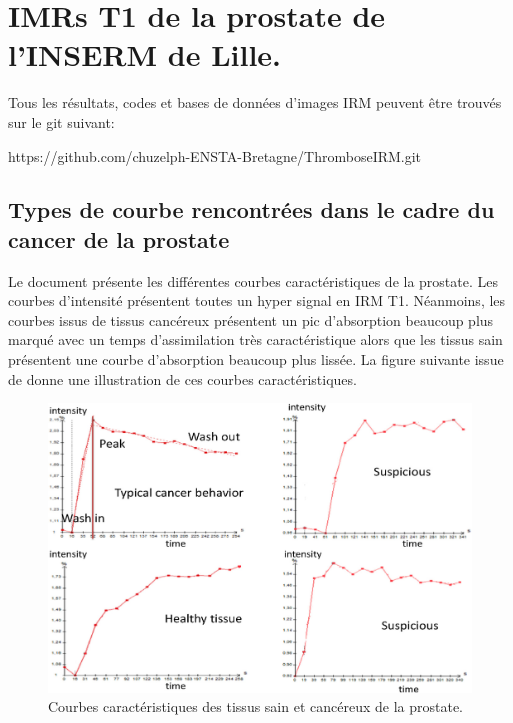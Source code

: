 \chapter{IMRs T1 de la prostate de l'INSERM de Lille.}

Tous les résultats, codes et bases de données d'images IRM peuvent être trouvés sur le git suivant:

\medskip

https://github.com/chuzelph-ENSTA-Bretagne/ThromboseIRM.git

\medskip

\section{Types de courbe rencontrées dans le cadre du cancer de la prostate}


Le document \cite{doi2007computer} présente les différentes courbes caractéristiques de la prostate. Les courbes d'intensité présentent toutes un hyper signal en IRM T1. Néanmoins, les courbes issus de tissus cancéreux présentent un pic d'absorption beaucoup plus marqué avec un temps d'assimilation très caractéristique alors que les tissus sain présentent une courbe d'absorption beaucoup plus lissée. La figure suivante issue de \cite{doi2007computer} donne une illustration de ces courbes caractéristiques.

\medskip

\begin{figure}[H]
\centering
    \includegraphics[scale=0.35,angle=0]{Images/CourbeProstate.png}
    \caption{Courbes caractéristiques des tissus sain et cancéreux de la prostate.}
    \label{fig:CourbeProstate}
\end{figure}

